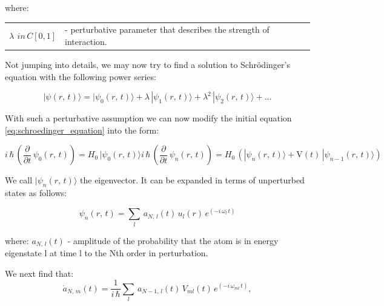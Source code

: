 \documentclass[12pt,twoside,a4paper]{article}
\numberwithin{equation}{subsection}
\numberwithin{figure}{subsection}
\newcommand{\ket}[1]{|#1\rangle}
\begin{document}
where: 

\begin{tabular} {r l}
  $\lambda \,\ in \,C[0, 1]$ & - perturbative parameter that describes the strength of interaction. 
\end{tabular}



Not jumping into details, we may now try to find a solution to Schrödinger's equation with the following power series:

\begin{equation} \label{eq:schrodinger_solution}
  \ket{\psi (r, \,t) } = \ket{ \psi_{0}(r, \,t)} + \lambda \,\ket{\psi_{1}(r, \,t)} + \lambda^{2}\,\ket{\psi_{2}(r, \,t) } +
  \ldots
\end{equation}

With such a perturbative assumption we can now modify the initial equation \ref{eq:schroedinger_equation} into the form:

\begin{subequations} \label{eq:schrodinger_modified}
  \begin{equation}   \label{eq:smodified_zero}
    i\,\hbar\,({\frac {\partial }{\partial t}}\,\psi_{0}(r, \,t)) = H_{0}\, \ket{\psi_{0}(r, \,t)}
  \end{equation}
  \begin{equation}   \label{eq:smodified_n}
    i\,\hbar\,({\frac {\partial }{\partial t}}\,\psi_{n}(r, \,t)) = H_{0}\,( \ket{\psi_{n}(r, \,t)} +
    \mathrm{V}(t)\,\ket{\psi_{n-1}(r, \,t)})
  \end{equation}
\end{subequations}

We call $\ket{{\psi_{n}}(r, \,t)}$ the eigenvector. It can be expanded in terms of unperturbed states as follows:

\begin{equation} \label{eq:schrodinger_unperturbed}
  {\psi_{n}}(r, \,t)=\sum_{l}\,{a_{N, \,l}}(t)\,{u_{l}}(r)\,e^{( - i\,{\omega_{l}}\,t)}
\end{equation}

where: $a_{N,\,l}(t)$ - amplitude of the probability that the atom is in energy eigenstate l at time l to the Nth order in
perturbation.


We next find that:
\begin{equation} \label{eq:schrodinger_totaldiff}
  \dot a_{N, \,m}(t) = \frac {1}{i \, \hbar}\sum_{l} \, a_{N-1, \, l}(t) \, V_{ml}(t) \, e^{(-i\, \omega_{ml} \,t)},
\end{equation}
\end{document}
